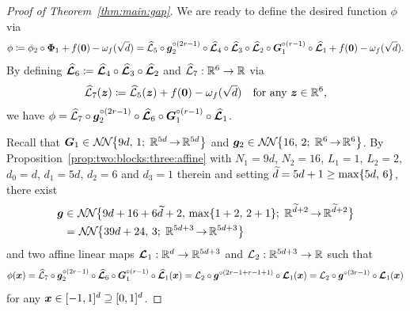 \documentclass[nohyperref]{article}
\theoremstyle{plain}
\theoremstyle{definition}
\theoremstyle{remark}
\begin{document}
\begin{proof}[Proof of Theorem~\ref{thm:main:gap}]

We are ready to define the desired function $\phi$ via
\begin{equation*}
	\phi\coloneqq \phi_2\circ{\bm{\Phi}}_1+f({\bm{0}})-\omega_f(\sqrt{d})=
	{\mathcal{\widehat{L}}}_5\circ {\bm{g}}_2^{\circ (2r-1)}\circ {\bm{\mathcal{\widehat{L}}}}_4\circ {\bm{\mathcal{\widehat{L}}}}_3\circ {\bm{\mathcal{\widehat{L}}}}_2\circ {\bm{G}}_1^{\circ (r-1)}\circ {\bm{\mathcal{\widehat{L}}}}_1+f({\bm{0}})-\omega_f(\sqrt{d}).
\end{equation*}
By defining
${\bm{\mathcal{\widehat{L}}}}_6\coloneqq {\bm{\mathcal{\widehat{L}}}}_4\circ {\bm{\mathcal{\widehat{L}}}}_3\circ {\bm{\mathcal{\widehat{L}}}}_2$ and $\hatcalL_7:\R^6\to \R$ via 
\begin{equation*}
	\hatcalL_7(\bmz)\coloneqq \hatcalL_5(\bmz)+f(\bmzero)-\omega_f(\sqrt{d})\quad \tn{for any $\bmz\in \R^6$,}
\end{equation*}
we have $\phi={\mathcal{\widehat{L}}}_7\circ {\bm{g}}_2^{\circ (2r-1)}\circ{\bm{\mathcal{\widehat{L}}}}_6\circ {\bm{G}}_1^{\circ (r-1)}\circ {\bm{\mathcal{\widehat{L}}}}_1$. 


Recall that $\bmG_1 \in
\nn[\big]{9d}{1}{5d}{5d}$ and $\bmg_2 \in
\nn[\big]{16}{2}{6}{6}$.
By Proposition~\ref{prop:two:blocks:three:affine} with $N_1=9d$, $N_2=16$, $L_1=1$, $L_2=2$, $d_0=d$, $d_1=5d$, $d_2=6$ and $d_3=1$ therein  and setting ${\widetilde{d}}=5d+1\ge \max\{5d,\, 6\}$, there exist
\begin{equation*}
	\begin{split}
			\bmg&\in\nn[\big]{9d+16+6\tilded + 2}{\max\{1+2,\,2+1\}}{\tilded+2}{\tilded+2}\\
			&= \nn[\big]{39d+24}{3}{5d+3}{5d+3}\\
	\end{split}
\end{equation*}
and two affine linear maps $\bmcalL_1:\R^d\to \R^{5d+3}$ and $\calL_2:\R^{5d+3}\to \R$ such that
\begin{equation*}
	\phi({\bm{x}})={\mathcal{\widehat{L}}}_7\circ {\bm{g}}_2^{\circ (2r-1)}\circ{\bm{\mathcal{\widehat{L}}}}_6\circ {\bm{G}}_1^{\circ (r-1)}\circ {\bm{\mathcal{\widehat{L}}}}_1({\bm{x}})=
	{\mathcal{L}}_2\circ {\bm{g}}^{\circ (2r-1+r-1+1)}\circ {\bm{\mathcal{L}}}_1({\bm{x}})
	={\mathcal{L}}_2\circ {\bm{g}}^{\circ (3r-1)}\circ {\bm{\mathcal{L}}}_1({\bm{x}})
\end{equation*}
for any ${\bm{x}}\in [-1,1]^d\supseteq [0,1]^d$.





\end{proof}
\end{document}
